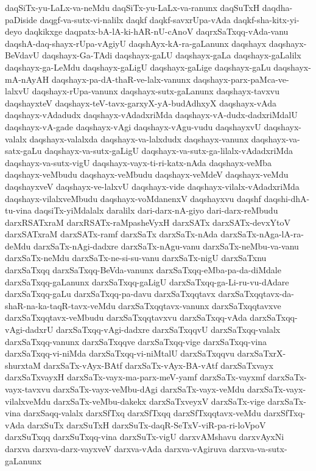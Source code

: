 {daqSiTx-yu-LaLx-va-neMdu
daqSiTx-yu-LaLx-va-ranunx
daqSuTxH
daqdha-paDiside
daqgf-va-sutx-vi-nalilx
daqkf
daqkf-savxrUpa-vAda
daqkf-sha-kitx-yi-deyo
daqkikxge
daqpatx-bA-lA-ki-hAR-nU-cAnoV
daqrxSaTxqq-vAda-vanu
daqshA-daq-shayx-rUpa-vAgiyU
daqshAyx-kA-ra-gaLanunx
daqshayx
daqshayx-BeVdavU
daqshayx-Ga-TAdi
daqshayx-gaLU
daqshayx-gaLa
daqshayx-gaLalilx
daqshayx-ga-LeMdu
daqshayx-gaLigU
daqshayx-gaLige
daqshayx-gaLu
daqshayx-mA-nAyAH
daqshayx-pa-dA-thaR-ve-lalx-vanunx
daqshayx-parx-paMca-ve-lalxvU
daqshayx-rUpa-vanunx
daqshayx-sutx-gaLanunx
daqshayx-tavxvu
daqshayxteV
daqshayx-teV-tavx-garxyX-yA-budAdhxyX
daqshayx-vAda
daqshayx-vAdadudx
daqshayx-vAdadxriMda
daqshayx-vA-dudx-dadxriMdalU
daqshayx-vA-gade
daqshayx-vAgi
daqshayx-vAgu-vudu
daqshayxvU
daqshayx-valalx
daqshayx-valalxda
daqshayx-va-lalxdudx
daqshayx-vanunx
daqshayx-va-satx-gaLu
daqshayx-va-sutx-gaLigU
daqshayx-va-sutx-ga-lilalx-vAdadxriMda
daqshayx-va-sutx-vigU
daqshayx-vayx-ti-ri-katx-nAda
daqshayx-veMba
daqshayx-veMbudu
daqshayx-veMbudu
daqshayx-veMdeV
daqshayx-veMdu
daqshayxveV
daqshayx-ve-lalxvU
daqshayx-vide
daqshayx-vilalx-vAdadxriMda
daqshayx-vilalxveMbudu
daqshayx-voMdanenxV
daqshayxvu
daqshf
daqshi-dhA-tu-vina
daqsiTx-yiMdalalx
daralilx
dari-darx-nA-giyo
dari-darx-reMbudu
darxRSATxraM
darxRSATx-raMpasheVyxH
darxSATx
darxSATx-devxYtoV
darxSATxraM
darxSATx-ramf
darxSaTx
darxSaTx-nAda
darxSaTx-nAga-lA-ra-deMdu
darxSaTx-nAgi-dadxre
darxSaTx-nAgu-vanu
darxSaTx-neMbu-va-vanu
darxSaTx-neMdu
darxSaTx-ne-si-su-vanu
darxSaTx-nigU
darxSaTxnu
darxSaTxqq
darxSaTxqq-BeVda-vanunx
darxSaTxqq-eMba-pa-da-diMdale
darxSaTxqq-gaLanunx
darxSaTxqq-gaLigU
darxSaTxqq-ga-Li-ru-vu-dAdare
darxSaTxqq-gaLu
darxSaTxqq-pa-davu
darxSaTxqqtavx
darxSaTxqqtavx-da-shaR-na-ka-taqR-tavx-veMdu
darxSaTxqqtavx-vanunx
darxSaTxqqtavxve
darxSaTxqqtavx-veMbudu
darxSaTxqqtavxvu
darxSaTxqq-vAda
darxSaTxqq-vAgi-dadxrU
darxSaTxqq-vAgi-dadxre
darxSaTxqqvU
darxSaTxqq-valalx
darxSaTxqq-vanunx
darxSaTxqqve
darxSaTxqq-vige
darxSaTxqq-vina
darxSaTxqq-vi-niMda
darxSaTxqq-vi-niMtalU
darxSaTxqqvu
darxSaTxrX-shurxtaM
darxSaTx-vAyx-BAtf
darxSaTx-vAyx-BA-vAtf
darxSaTxvayx
darxSaTxvayxH
darxSaTx-vayx-ma-parx-meV-yamf
darxSaTx-vayxmf
darxSaTx-vayx-tavxvu
darxSaTx-vayx-veMbu-dAgi
darxSaTx-vayx-veMdu
darxSaTx-vayx-vilalxveMdu
darxSaTx-veMbu-dakekx
darxSaTxveyxV
darxSaTx-vige
darxSaTx-vina
darxSaqq-valalx
darxSfTxq
darxSfTxqq
darxSfTxqqtavx-veMdu
darxSfTxq-vAda
darxSuTx
darxSuTxH
darxSuTx-daqR-SeTxV-viR-pa-ri-loVpoV
darxSuTxqq
darxSuTxqq-vina
darxSuTx-vigU
darxvAMshavu
darxvAyxNi
darxva
darxva-darx-vayxveV
darxva-vAda
darxva-vAgiruva
darxva-va-sutx-gaLanunx
}
